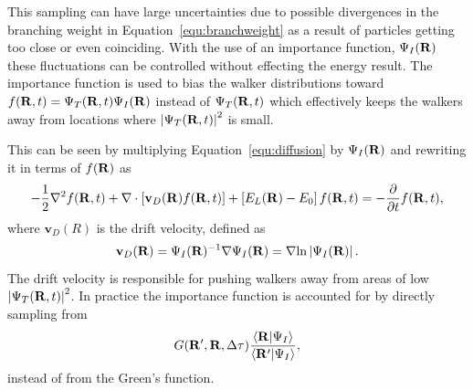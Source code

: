 This sampling can have large uncertainties due to possible divergences in the branching weight in Equation~\ref{equ:branchweight} as a result of particles getting too close or even coinciding. With the use of an importance function, $\Psi_I(\mathbf{R})$ these fluctuations can be controlled without effecting the energy result. The importance function is used to bias the walker distributions toward $f(\mathbf{R},t) = \Psi_T(\mathbf{R},t)\Psi_I(\mathbf{R})$ instead of $\Psi_T(\mathbf{R},t)$ which effectively keeps the walkers away from locations where $\left|\Psi_T(\mathbf{R},t)\right|^2$ is small.

This can be seen by multiplying Equation~\ref{equ:diffusion} by $\Psi_I(\mathbf{R})$ and rewriting it in terms of $f(\mathbf{R})$ as
\begin{equation}
   -\frac{1}{2}\nabla^2 f(\mathbf{R},t) + \nabla\cdot\left[\mathbf{v}_D(\mathbf{R}) f(\mathbf{R},t)\right] + \left[E_L(\mathbf{R})-E_0\right]f(\mathbf{R},t) = -\frac{\partial}{\partial t} f(\mathbf{R},t),
\end{equation}
where $\mathbf{v}_D(R)$ is the drift velocity, defined as
\begin{equation}
   \mathbf{v}_D(\mathbf{R}) = \Psi_I(\mathbf{R})^{-1}\nabla\Psi_I(\mathbf{R}) = \nabla \text{ln}\left|\Psi_I(\mathbf{R})\right|.
\end{equation}
The drift velocity is responsible for pushing walkers away from areas of low $\left|\Psi_T(\mathbf{R},t)\right|^2$. In practice the importance function is accounted for by directly sampling from
\begin{equation}
   G(\mathbf{R}',\mathbf{R},\Delta\tau)\frac{\left< \mathbf{R} | \Psi_I \right>}{\left< \mathbf{R}' | \Psi_I \right>},
\end{equation}
instead of from the Green's function.


